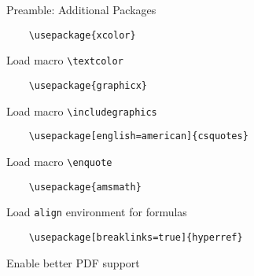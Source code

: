 \begin{frame}[fragile]{Preamble: Additional Packages}

  \begin{lstlisting}
    \usepackage{xcolor}
  \end{lstlisting}
  Load macro \lstinline-\textcolor-

  \begin{lstlisting}
    \usepackage{graphicx}  
  \end{lstlisting}
  Load macro \lstinline-\includegraphics-

  \begin{lstlisting}
    \usepackage[english=american]{csquotes}
  \end{lstlisting}
  Load macro \lstinline-\enquote-

  \begin{lstlisting}
    \usepackage{amsmath}
  \end{lstlisting}
  Load \lstinline-align- environment for formulas

  \begin{lstlisting}
    \usepackage[breaklinks=true]{hyperref}
  \end{lstlisting}
  Enable better PDF support
\end{frame}
